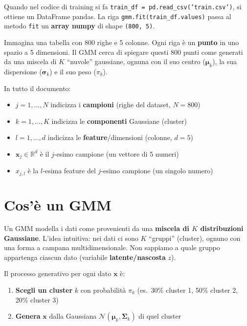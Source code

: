 \documentclass[11pt,a4paper]{article}
\begin{document}
Quando nel codice di training si fa \texttt{train\_df = pd.read\_csv('train.csv')}, si ottiene un DataFrame pandas. La riga \texttt{gmm.fit(train\_df.values)} passa al metodo \texttt{fit} un \textbf{array numpy} di shape \texttt{(800, 5)}.

\begin{exbox}
Immagina una tabella con 800 righe e 5 colonne. Ogni riga \`e un \textbf{punto} in uno spazio a 5 dimensioni. Il GMM cerca di spiegare questi 800 punti come generati da una miscela di $K$ ``nuvole'' gaussiane, ognuna con il suo centro ($\boldsymbol{\mu}_k$), la sua dispersione ($\boldsymbol{\sigma}_k$) e il suo peso ($\pi_k$).
\end{exbox}

\begin{infobox}
In tutto il documento:
\begin{itemize}
    \item $j = 1,\ldots,N$ indicizza i \textbf{campioni} (righe del dataset, $N=800$)
    \item $k = 1,\ldots,K$ indicizza le \textbf{componenti} Gaussiane (cluster)
    \item $l = 1,\ldots,d$ indicizza le \textbf{feature}/dimensioni (colonne, $d=5$)
    \item $\mathbf{x}_j \in \mathbb{R}^d$ \`e il $j$-esimo campione (un vettore di 5 numeri)
    \item $x_{j,l}$ \`e la $l$-esima feature del $j$-esimo campione (un singolo numero)
\end{itemize}
\end{infobox}

\section{Cos'\`e un GMM}

Un GMM modella i dati come provenienti da una \textbf{miscela di $K$ distribuzioni Gaussiane}. L'idea intuitiva: nei dati ci sono $K$ ``gruppi'' (cluster), ognuno con una forma a campana multidimensionale. Non sappiamo a quale gruppo appartenga ciascun dato (variabile \textbf{latente/nascosta} $z$).

\medskip
Il processo generativo per ogni dato $\mathbf{x}$ \`e:
\begin{enumerate}
    \item \textbf{Scegli un cluster} $k$ con probabilit\`a $\pi_k$ (es.\ 30\% cluster 1, 50\% cluster 2, 20\% cluster 3)
    \item \textbf{Genera} $\mathbf{x}$ dalla Gaussiana $\mathcal{N}(\boldsymbol{\mu}_k, \boldsymbol{\Sigma}_k)$ di quel cluster
\end{enumerate}
\end{document}

